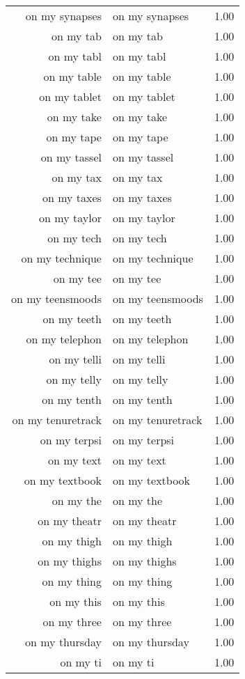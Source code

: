 \begin{table}[ht]
\begin{tabular}{rlr}
  on my synapses & on my synapses & 1.00 \\ 
  on my tab & on my tab & 1.00 \\ 
  on my tabl & on my tabl & 1.00 \\ 
  on my table & on my table & 1.00 \\ 
  on my tablet & on my tablet & 1.00 \\ 
  on my take & on my take & 1.00 \\ 
  on my tape & on my tape & 1.00 \\ 
  on my tassel & on my tassel & 1.00 \\ 
  on my tax & on my tax & 1.00 \\ 
  on my taxes & on my taxes & 1.00 \\ 
  on my taylor & on my taylor & 1.00 \\ 
  on my tech & on my tech & 1.00 \\ 
  on my technique & on my technique & 1.00 \\ 
  on my tee & on my tee & 1.00 \\ 
  on my teensmoods & on my teensmoods & 1.00 \\ 
  on my teeth & on my teeth & 1.00 \\ 
  on my telephon & on my telephon & 1.00 \\ 
  on my telli & on my telli & 1.00 \\ 
  on my telly & on my telly & 1.00 \\ 
  on my tenth & on my tenth & 1.00 \\ 
  on my tenuretrack & on my tenuretrack & 1.00 \\ 
  on my terpsi & on my terpsi & 1.00 \\ 
  on my text & on my text & 1.00 \\ 
  on my textbook & on my textbook & 1.00 \\ 
  on my the & on my the & 1.00 \\ 
  on my theatr & on my theatr & 1.00 \\ 
  on my thigh & on my thigh & 1.00 \\ 
  on my thighs & on my thighs & 1.00 \\ 
  on my thing & on my thing & 1.00 \\ 
  on my this & on my this & 1.00 \\ 
  on my three & on my three & 1.00 \\ 
  on my thursday & on my thursday & 1.00 \\ 
  on my ti & on my ti & 1.00 \\ 

\end{tabular}
\end{table}
